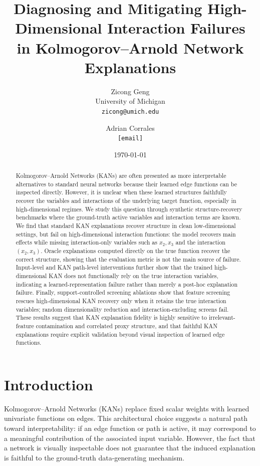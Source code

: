\documentclass[11pt]{article}
\title{
Diagnosing and Mitigating High-Dimensional Interaction Failures\\
in Kolmogorov--Arnold Network Explanations
}
\author{
Zicong Geng \\
University of Michigan \\
\texttt{zicong@umich.edu}
\and
Adrian Corrales \\
\texttt{[email]}
}
\date{\today}
\begin{document}
\maketitle

\begin{abstract}
Kolmogorov--Arnold Networks (KANs) are often presented as more interpretable alternatives to standard neural networks because their learned edge functions can be inspected directly.
However, it is unclear when these learned structures faithfully recover the variables and interactions of the underlying target function, especially in high-dimensional regimes.
We study this question through synthetic structure-recovery benchmarks where the ground-truth active variables and interaction terms are known.
We find that standard KAN explanations recover structure in clean low-dimensional settings, but fail on high-dimensional interaction functions: the model recovers main effects while missing interaction-only variables such as $x_2,x_3$ and the interaction $(x_2,x_3)$.
Oracle explanations computed directly on the true function recover the correct structure, showing that the evaluation metric is not the main source of failure.
Input-level and KAN path-level interventions further show that the trained high-dimensional KAN does not functionally rely on the true interaction variables, indicating a learned-representation failure rather than merely a post-hoc explanation failure.
Finally, support-controlled screening ablations show that feature screening rescues high-dimensional KAN recovery only when it retains the true interaction variables; random dimensionality reduction and interaction-excluding screens fail.
These results suggest that KAN explanation fidelity is highly sensitive to irrelevant-feature contamination and correlated proxy structure, and that faithful KAN explanations require explicit validation beyond visual inspection of learned edge functions.
\end{abstract}

\section{Introduction}

Kolmogorov--Arnold Networks (KANs) replace fixed scalar weights with learned univariate functions on edges.
This architectural choice suggests a natural path toward interpretability: if an edge function or path is active, it may correspond to a meaningful contribution of the associated input variable.
However, the fact that a network is visually inspectable does not guarantee that the induced explanation is faithful to the ground-truth data-generating mechanism.
\end{document}
